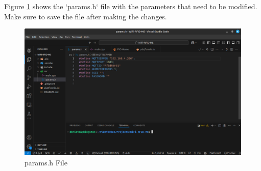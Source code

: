 Figure \ref{fig:params} shows the `params.h` file with the parameters that need to be modified. Make sure to save the file after making the changes.
\begin{figure}[H]
    \centering
    \includegraphics[scale=0.33]{./images/vsc-rfidsw.png}
    \caption{params.h File}
    \label{fig:params}
\end{figure}


